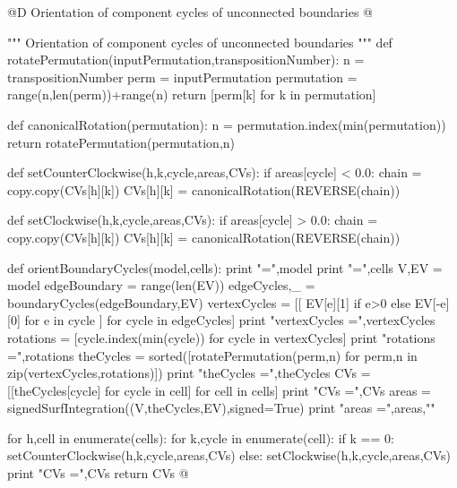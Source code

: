 \documentclass[11pt,oneside]{article}	%
\begin{document}
@D Orientation of component cycles of unconnected boundaries 
@{""" Orientation of component cycles of unconnected boundaries """
def rotatePermutation(inputPermutation,transpositionNumber):
    n = transpositionNumber
    perm = inputPermutation
    permutation = range(n,len(perm))+range(n) 
    return [perm[k] for k in permutation]

def canonicalRotation(permutation):
    n = permutation.index(min(permutation))
    return rotatePermutation(permutation,n)

def setCounterClockwise(h,k,cycle,areas,CVs):
    if areas[cycle] < 0.0: 
        chain = copy.copy(CVs[h][k])
        CVs[h][k] = canonicalRotation(REVERSE(chain))

def setClockwise(h,k,cycle,areas,CVs):
    if areas[cycle] > 0.0: 
        chain = copy.copy(CVs[h][k])
        CVs[h][k] = canonicalRotation(REVERSE(chain))

def orientBoundaryCycles(model,cells):
    print "\nmodel =",model
    print "\ncells =",cells
    V,EV = model
    edgeBoundary = range(len(EV))
    edgeCycles,_ = boundaryCycles(edgeBoundary,EV)
    vertexCycles = [[ EV[e][1] if e>0 else EV[-e][0] for e in cycle ] for cycle in edgeCycles]
    print "vertexCycles =",vertexCycles
    rotations = [cycle.index(min(cycle)) for cycle in vertexCycles]
    print "rotations =",rotations
    theCycles = sorted([rotatePermutation(perm,n) for perm,n in zip(vertexCycles,rotations)])
    print "theCycles =",theCycles
    CVs = [[theCycles[cycle] for cycle in cell] for cell in cells]
    print "CVs =",CVs
    areas = signedSurfIntegration((V,theCycles,EV),signed=True)
    print "areas =",areas,"\n"
    
    for h,cell in enumerate(cells):
        for k,cycle in enumerate(cell):
            if k == 0: setCounterClockwise(h,k,cycle,areas,CVs)
            else: setClockwise(h,k,cycle,areas,CVs)
    print "CVs =",CVs
    return CVs
@}
\end{document}

